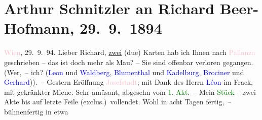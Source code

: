 

               \section[Arthur Schnitzler an Richard Beer-Hofmann, 29. 9. 1894]{ Arthur Schnitzler an Richard Beer-Hofmann, 29. 9. 1894}\nopagebreak{}\rehead{ }\normalsize\beginnumbering{} \toendnotes[C]{\smallbreak\pagebreak[2]} 
\toendnotes[C]{\smallbreak}\pstart
           \raggedleft{}{\pb}\textcolor{pink}{Wien}{}\ledrightnote{\textcolor{pink}{Wien}}, 29. 9. 94.\pend
           \pstart
           Lieber Richard, \uline{zwei} (due) Karten hab ich Ihnen nach \textcolor{pink}{Pallanza}{}\ledrightnote{\textcolor{pink}{Pallanza}} geschrieben – das ist doch mehr als Mau? – Sie sind
               offenbar verloren gegangen.\pend
           \pstart
           (Wer, – ich? (\textcolor{blue}{Leon}{}\ledrightnote{\textcolor{blue}{Victor Léon}} und \textcolor{blue}{Waldberg}{}\ledrightnote{\textcolor{blue}{Heinrich von Waldberg}}, \textcolor{blue}{Blumenthal}{}\ledrightnote{\textcolor{blue}{Oskar Blumenthal}} und
                  \textcolor{blue}{Kadelburg}{}\ledrightnote{\textcolor{blue}{Gustav Kadelburg}}, \textcolor{blue}{Brociner}{}\ledrightnote{\textcolor{blue}{Marco Brociner}} und \textcolor{blue}{Gerhard}{}\ledrightnote{\textcolor{blue}{Leopold Geiringer}})). –\pend
           \pstart
           Gestern Eröffnung \textcolor{pink}{Josefstadt}{}\ledrightnote{\textcolor{pink}{Theater in der Josefstadt}}; mit Dank des Herrn \textcolor{blue}{Léon}{}\ledrightnote{\textcolor{blue}{Victor Léon}} im Frack, mit gekränkter Miene. Sehr amüsant,
               abgesehn vom \textcolor{green}{1. Akt}{}. –\pend
           \pstart
           Mein \textcolor{green}{Stück}{} – zwei Akte bis auf
               letzte Feile (exclus.) vollendet. Wohl in acht Tagen fertig, – bühnenfertig in etwa
